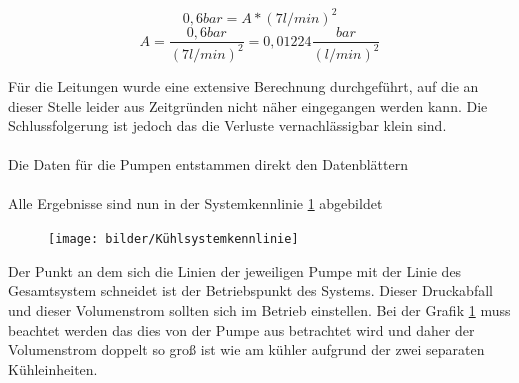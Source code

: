 \begin{equation}
	0,6 bar = A * (7 l/min)^2  
\end{equation}
\begin{equation}
	A = \dfrac{0,6 bar}{(7 l/min)^2 }
	  = 0,01224 \dfrac{bar}{(l/min)^2}
\end{equation}

Für die Leitungen wurde eine extensive Berechnung durchgeführt, auf die an dieser Stelle leider aus Zeitgründen nicht näher eingegangen werden kann. Die Schlussfolgerung ist jedoch das die Verluste vernachlässigbar klein sind. \\
\\
Die Daten für die Pumpen entstammen direkt den Datenblättern\\
\\
Alle Ergebnisse sind nun in der Systemkennlinie \ref{fig:kuhlsystemkennlinie} abgebildet

\begin{figure}[h]
	\centering
	\texttt{[image: bilder/Kühlsystemkennlinie]}
	\caption{}
	\label{fig:kuhlsystemkennlinie}
\end{figure}

Der Punkt an dem sich die Linien der jeweiligen Pumpe mit der Linie des Gesamtsystem schneidet ist der Betriebspunkt des Systems. Dieser Druckabfall und dieser Volumenstrom sollten sich im Betrieb einstellen. Bei der Grafik \ref{fig:kuhlsystemkennlinie} muss beachtet werden das dies von der Pumpe aus betrachtet wird und daher der Volumenstrom doppelt so groß ist wie am kühler aufgrund der zwei separaten Kühleinheiten.

\FloatBarrier

